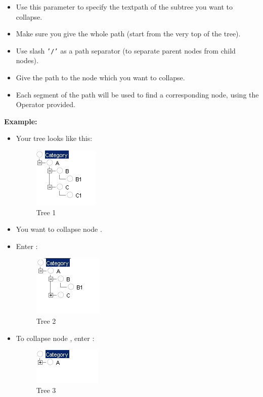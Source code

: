   \begin{itemize}
\item Use this parameter to specify the textpath of the subtree you want to collapse.
\item Make sure you give the whole path (start from the very top of the tree).
\item Use slash {\tt '/'} as a path separator (to separate parent nodes from child nodes).
\item Give the path to the node which you want to collapse.
\item Each segment of the path will be used to find a corresponding node, using the Operator provided.
  \end{itemize}

\textbf{Example:}

\begin{itemize}
\item Your tree looks like this:

\begin{figure}
\begin{center}
\includegraphics{PS/Treeexample}
\caption{Tree 1}
\label{treeexample}
\end{center}
\end{figure}

\item You want to collapse node . 
\item Enter :

\begin{figure}
\begin{center}
\includegraphics{PS/Treeexample2}
\caption{Tree 2}
\label{treeexample2}
\end{center}
\end{figure}

\item To collapse node , enter :

\begin{figure}
\begin{center}
\includegraphics{PS/Treeexample3}
\caption{Tree 3}
\label{treeexample3}
\end{center}
\end{figure}

\end{itemize}

